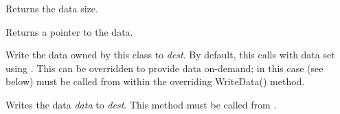 
Returns the data size.

\label{wxprivatedataobjectgetdata}


Returns a pointer to the data.

\label{wxprivatedataobjectwritedata}


Write the data owned by this class to {\it dest}. By default, this
calls  with data 
set using .
This can be overridden to provide data on-demand; in this case
 (see below) must be called from
within the overriding WriteData() method.

\label{wxprivatedataobjectwritedata2}


Writes the data {\it data} to {\it dest}. This method must be called
from .

